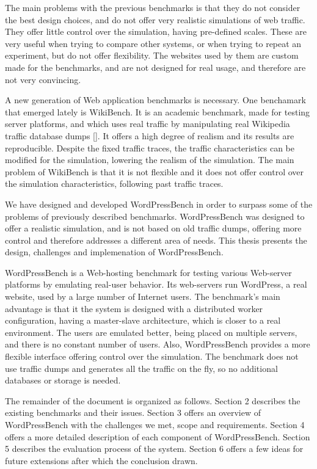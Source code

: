 The main problems with the previous benchmarks is that they do not consider the best design choices, and do not offer very realistic simulations of web traffic. They offer little control over the simulation, having pre-defined scales. These are very useful when trying to compare other systems, or when trying to repeat an experiment, but do not offer flexibility. The websites used by them are custom made for the benchmarks, and are not designed for real usage, and therefore are not very convincing.

A new generation of Web application benchmarks is necessary. One benchamark that emerged lately is WikiBench. It is an academic  benchmark, made for testing server platforms, and which uses real traffic by manipulating real Wikipedia traffic database dumps []. It offers a high degree of realism and its results are reproducible. Despite the fixed traffic traces, the traffic characteristics can be modified for the simulation, lowering the realism of the simulation. The main problem of WikiBench is that it is not flexible and it does not offer control over the simulation characteristics, following past traffic traces.

We have designed and developed WordPressBench in order to surpass some of the problems of previously described benchmarks. WordPressBench was designed to offer a realistic simulation, and is not based on old traffic dumps, offering more control and therefore addresses a different area of needs. This thesis presents the design, challenges and implemenation of WordPressBench.

WordPressBench is a Web-hosting benchmark for testing various Web-server platforms by emulating real-user behavior. Its web-servers run WordPress, a real website, used by a large number of Internet users. The benchmark's main advantage is that it the system is designed with a distributed worker configuration, having a master-slave architecture, which is closer to a real environment. The users are emulated better, being placed on multiple servers, and there is no constant number of users. Also, WordPressBench provides a more flexible interface offering control over the simulation. The benchmark does not use traffic dumps and generates all the traffic on the fly, so no additional databases or storage is needed.

The remainder of the document is organized as follows. Section 2 describes the existing benchmarks and their issues. Section 3 offers an overview of WordPressBench with the challenges we met, scope and requirements. Section 4 offers a more detailed description of each component of  WordPressBench. Section 5 describes the evaluation process of the system.
Section 6 offers a few ideas for future extensions after which the conclusion drawn.
